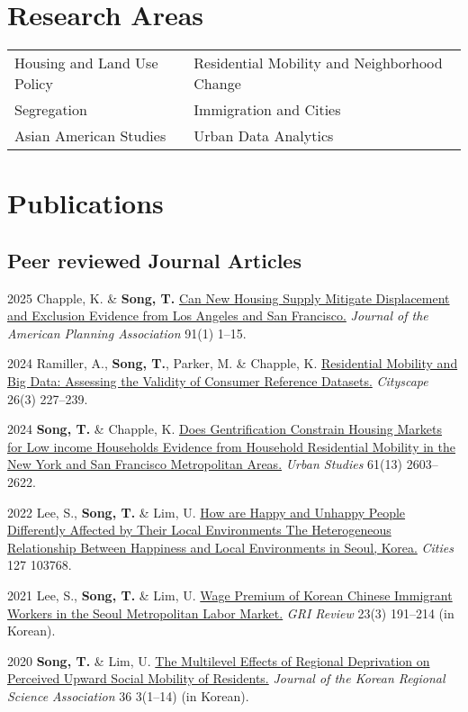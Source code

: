\documentclass[11pt,letterpaper]{article}
\begin{document}
\section{Research Areas}
\begin{tabular}{@{}p{} p{}@{}}
Housing and Land Use Policy & Residential Mobility and Neighborhood Change\\
Segregation & Immigration and Cities\\
Asian American Studies & Urban Data Analytics
\end{tabular}

\section{Publications}

\subsection{Peer reviewed Journal Articles}
\begin{tablist}
  \item[2025] \tab{}Chapple, K. \& \textbf{Song, T.} \href{https://doi.org/10.1080/01944363.2024.2319293}{Can New Housing Supply Mitigate Displacement and Exclusion Evidence from Los Angeles and San Francisco.} \emph{Journal of the American Planning Association} 91(1) 1–15.
  \item[2024] \tab{}Ramiller, A., \textbf{Song, T.}, Parker, M. \& Chapple, K. \href{https://www.jstor.org/stable/48799257}{Residential Mobility and Big Data: Assessing the Validity of Consumer Reference Datasets.} \emph{Cityscape} 26(3) 227–239.
  \item[2024] \tab{}\textbf{Song, T.} \& Chapple, K. \href{https://doi.org/10.1177/00420980241244699}{Does Gentrification Constrain Housing Markets for Low income Households Evidence from Household Residential Mobility in the New York and San Francisco Metropolitan Areas.} \emph{Urban Studies} 61(13) 2603–2622.
  \item[2022] \tab{}Lee, S., \textbf{Song, T.} \& Lim, U. \href{https://doi.org/10.1016/j.cities.2022.103768}{How are Happy and Unhappy People Differently Affected by Their Local Environments The Heterogeneous Relationship Between Happiness and Local Environments in Seoul, Korea.} \emph{Cities} 127 103768.
  \item[2021] \tab{}Lee, S., \textbf{Song, T.} \& Lim, U. \href{https://www.dbpia.co.kr/Journal/articleDetail?nodeId=NODE11025769}{Wage Premium of Korean Chinese Immigrant Workers in the Seoul Metropolitan Labor Market.} \emph{GRI Review} 23(3) 191–214 (in Korean).
  \item[2020] \tab{}\textbf{Song, T.} \& Lim, U. \href{https://www.koreascience.or.kr/article/JAKO202030161655441.page}{The Multilevel Effects of Regional Deprivation on Perceived Upward Social Mobility of Residents.} \emph{Journal of the Korean Regional Science Association} 36 3(1–14) (in Korean).
\end{tablist}
\end{document}
